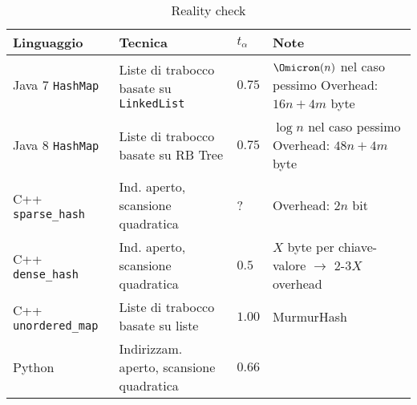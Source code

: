\begin{table}[!hb]\centering
    \caption{Reality check}
    \begin{tabular}{@{} *{4}{l} @{}}
        \toprule
            \textbf{Linguaggio} & \textbf{Tecnica} & \(t_{\alpha}\) & \textbf{Note}\\
        \midrule
            Java 7 \texttt{HashMap} & Liste di trabocco basate su \texttt{LinkedList} & \(0.75\) & \makecell[l]{\(\Omicron(n)\) nel caso pessimo\\Overhead: \(16n + 4m\) byte}\\
        \lightrule
            Java 8 \texttt{HashMap} & Liste di trabocco basate su RB Tree & \(0.75\) & \makecell[l]{\(\log n\) nel caso pessimo\\Overhead: \(48n + 4m\) byte}\\
        \lightrule
            C++ \texttt{sparse\_hash} & Ind. aperto, scansione quadratica & ? & Overhead: \(2n\) bit\\
        \lightrule
            C++ \texttt{dense\_hash} & Ind. aperto, scansione quadratica & \(0.5\) & \makecell[l]{\(X\) byte per chiave-valore\\\(\rightarrow\) 2-3\(X\) overhead}\\
        \lightrule
            C++ \texttt{unordered\_map} & Liste di trabocco basate su liste & \(1.00\) & MurmurHash\\
        \lightrule
            Python & Indirizzam. aperto, scansione quadratica & \(0.66\) &\\
        \bottomrule
    \end{tabular}
\end{table}

\ifsubfile

\fi